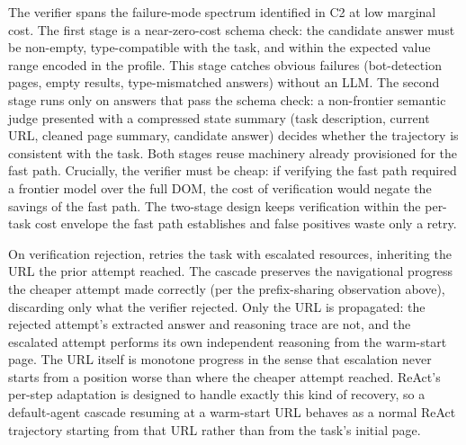 
The verifier spans the failure-mode spectrum identified in C2 at
low marginal cost. The first stage is a near-zero-cost schema
check: the candidate answer must be non-empty, type-compatible
with the task, and within the expected value range encoded in
the profile. This stage catches obvious failures (bot-detection
pages, empty results, type-mismatched answers) without
an LLM. The second stage runs only on answers that pass the
schema check: a non-frontier semantic judge presented with a
compressed state summary (task description, current URL, cleaned
page summary, candidate answer) decides whether the trajectory
is consistent with the task. Both stages reuse machinery already
provisioned for the fast path. Crucially, the verifier must
be cheap: if verifying the fast path required a frontier
model over the full DOM, the cost of verification would negate
the savings of the fast path. The two-stage design keeps
verification within the per-task cost envelope the fast path
establishes and false positives waste only a retry.

On verification rejection, \sys{} retries the task with
escalated resources, inheriting the URL the prior attempt
reached. The cascade preserves the navigational progress the
cheaper attempt made correctly (per the prefix-sharing
observation above), discarding only what the verifier rejected.
Only the URL is propagated: the rejected attempt's extracted
answer and reasoning trace are not, and the escalated attempt
performs its own independent reasoning from the warm-start page.
The URL itself is monotone progress in the sense that escalation
never starts from a position worse than where the cheaper attempt
reached. ReAct's per-step adaptation is designed to handle
exactly this kind of recovery, so a default-agent
cascade resuming at a warm-start URL behaves as a normal ReAct
trajectory starting from that URL rather than from the task's
initial page.

